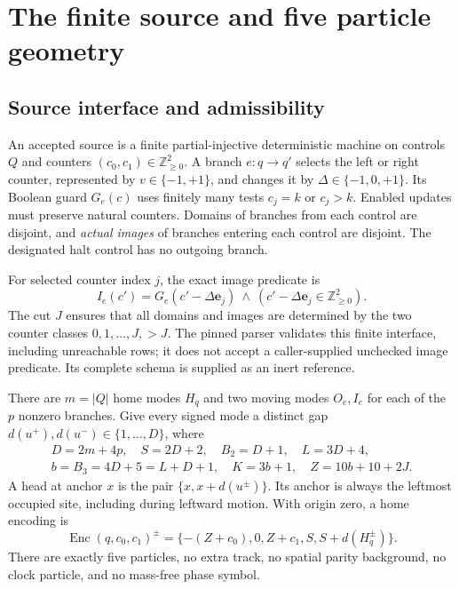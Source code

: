 \documentclass[11pt,a4paper]{article}
\numberwithin{equation}{section}
\newcommand{\Nge}{\mathbb Z_{\ge0}}\newcommand{\Nzero}{\mathbb N_0}
\begin{document}
\section{The finite source and five particle geometry}\label{fpa:pi:sec:source}
\subsection{Source interface and admissibility}
An accepted source is a finite partial-injective deterministic machine on controls $Q$ and counters $(c_0,c_1)\in\Nge^2$. A branch $e:q\to q'$ selects the left or right counter, represented by $v\in\{-1,+1\}$, and changes it by $\Delta\in\{-1,0,+1\}$. Its Boolean guard $G_e(c)$ uses finitely many tests $c_j=k$ or $c_j>k$. Enabled updates must preserve natural counters. Domains of branches from each control are disjoint, and \emph{actual images} of branches entering each control are disjoint. The designated halt control has no outgoing branch.

For selected counter index $j$, the exact image predicate is
\[
 I_e(c')=G_e(c'-\Delta\mathbf e_j)
 \ \wedge\ (c'-\Delta\mathbf e_j\in\Nge^2).
\]
The cut $J$ ensures that all domains and images are determined by the two counter classes $0,1,\ldots,J,>J$. The pinned parser validates this finite interface, including unreachable rows; it does not accept a caller-supplied unchecked image predicate. Its complete schema is supplied as an inert reference.

There are $m=|Q|$ home modes $H_q$ and two moving modes $O_e,I_e$ for each of the $p$ nonzero branches. Give every signed mode a distinct gap $d(u^+),d(u^-)\in\{1,\ldots,D\}$, where
\begin{equation}\label{fpa:pi:eq:constants}
\begin{gathered}
 D=2m+4p,\quad S=2D+2,\quad B_2=D+1,\quad L=3D+4,\\
 b=B_3=4D+5=L+D+1,\quad K=3b+1,\quad Z=10b+10+2J.
\end{gathered}
\end{equation}
A head at anchor $x$ is the pair $\{x,x+d(u^{\pm})\}$. Its anchor is always the leftmost occupied site, including during leftward motion. With origin zero, a home encoding is
\begin{equation}\label{fpa:pi:eq:encoding}
 \operatorname{Enc}(q,c_0,c_1)^{\pm}
 =\{-(Z+c_0),0,Z+c_1,S,S+d(H_q^{\pm})\}.
\end{equation}
There are exactly five particles, no extra track, no spatial parity background, no clock particle, and no mass-free phase symbol.
\end{document}
